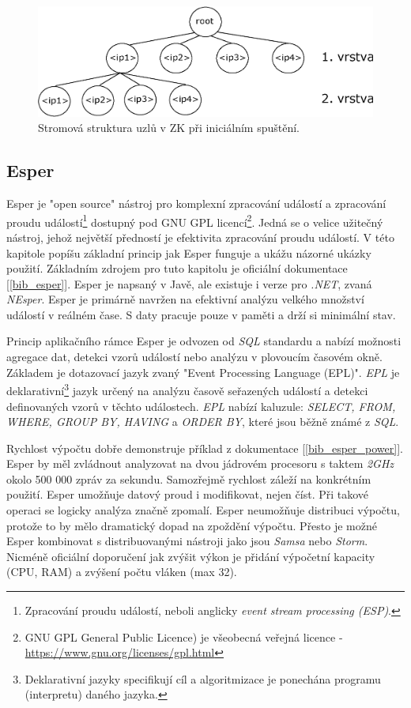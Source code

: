 \documentclass[
  digital, %
  table,   %
  nolof,     %
  nolot,     %
  oneside, %
  nocover,
  monochrome,
  12pt
]{fithesis3}
\begin{document}
\begin{figure}[H]
	\centering
    \includegraphics[width=1\textwidth, height=0.22\textheight]{images/zookeeper-impl.eps}
    \caption{Stromová struktura uzlů v ZK při iniciálním spuštění.}
    \label{fig:zookeeper-impl}
\end{figure}

\subsection{Esper}
\label{sec:esper}
Esper je "open source" nástroj pro komplexní zpracování událostí a zpracování proudu událostí\footnote{Zpracování proudu událostí, neboli anglicky \textit{event stream processing (ESP)}.} dostupný pod GNU GPL licencí\footnote{GNU GPL General Public Licence) je všeobecná veřejná licence - \url{https://www.gnu.org/licenses/gpl.html}}. Jedná se o velice užitečný nástroj, jehož největší předností je efektivita zpracování proudu událostí. V této kapitole popíšu základní princip jak Esper funguje a ukážu názorné ukázky použití. Základním zdrojem pro tuto kapitolu je oficiální dokumentace [\ref{bib_esper}]. Esper je napsaný v Javě, ale existuje i verze pro \textit{.NET}, zvaná \textit{NEsper}. Esper je primárně navržen na efektivní analýzu velkého množství událostí v reálném čase. S daty pracuje pouze v paměti a drží si minimální stav.

Princip aplikačního rámce Esper je odvozen od \textit{SQL} standardu a nabízí možnosti agregace dat, detekci vzorů událostí nebo analýzu v plovoucím časovém okně. Základem je dotazovací jazyk zvaný "Event Processing Language (EPL)". \textit{EPL} je deklarativní\footnote{Deklarativní jazyky specifikují cíl a algoritmizace je ponechána programu (interpretu) daného jazyka.} jazyk určený na analýzu časově seřazených událostí a detekci definovaných vzorů v těchto událostech. \textit{EPL} nabízí kaluzule: \textit{SELECT, FROM, WHERE, GROUP BY, HAVING} a \textit{ORDER BY}, které jsou běžně známé z \textit{SQL}.

Rychlost výpočtu dobře demonstruje příklad z dokumentace [\ref{bib_esper_power}]. Esper by měl zvládnout analyzovat na dvou jádrovém procesoru s taktem \textit{2GHz} okolo 500 000 zpráv za sekundu. Samozřejmě rychlost záleží na konkrétním použití. Esper umožňuje datový proud i modifikovat, nejen číst. Při takové operaci se logicky analýza značně zpomalí. Esper neumožňuje distribuci výpočtu, protože to by mělo dramatický dopad na zpoždění výpočtu. Přesto je možné Esper kombinovat s distribuovanými nástroji jako jsou \textit{Samsa} nebo \textit{Storm}. Nicméně oficiální doporučení jak zvýšit výkon je přidání výpočetní kapacity (CPU, RAM) a zvýšení počtu vláken (max 32).
\end{document}
